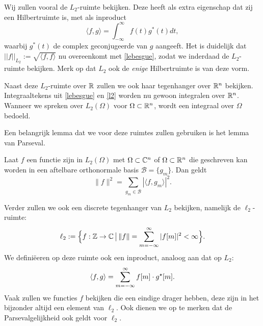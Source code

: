 Wij zullen vooral de $L_2$-ruimte bekijken. Deze heeft als extra eigenschap dat zij een Hilbertruimte is, 
met als inproduct
\begin{equation}
	\label{l2}
	\langle f, g \rangle = \int_{-\infty}^\infty f(t) g^*(t) dt,
\end{equation}
waarbij $g^*(t)$ de complex geconjugeerde van $g$ aangeeft.
Het is duidelijk dat $ || f ||_{L_2} := \sqrt{\langle f, f \rangle}$ nu overeenkomt met \eqref{lebesgue}, zodat we inderdaad de $L_2$-ruimte bekijken. Merk op dat $L_2$ ook de \emph{enige} Hilbertruimte is van deze vorm.

Naast deze $L_2$-ruimte over $\mathbb{R}$ zullen we ook haar tegenhanger over $\mathbb{R}^n$ bekijken. Integraaltekens uit \eqref{lebesgue} en \eqref{l2} worden nu gewoon integralen over $\mathbb{R}^n$. Wanneer we spreken over $L_2(\Omega)$ voor $\Omega \subset \mathbb{R}^n$, wordt een integraal over $\Omega$ bedoeld.

Een belangrijk lemma dat we voor deze ruimtes zullen gebruiken is het lemma van Parseval.
\begin{lemm}
  \label{parseval}
  Laat $f$ een functie zijn in $L_2(\Omega)$ met $\Omega \subset \mathbb{C}^n$ of $\Omega\subset\mathbb{R}^n$ die geschreven kan worden in een aftelbare 
  orthonormale basis $\mathcal{B}=\{g_m\}$. Dan geldt
  \[
  \|f\|^2 = \sum_{g_m\in\mathcal{B}} | \langle f, g_m \rangle |^2.
  \]
\end{lemm}

Verder zullen we ook een discrete tegenhanger van $L_2$ bekijken, namelijk de $\ell_2$-ruimte:
\[
\ell_2 :=\Big \{f:\mathbb{Z} \to \mathbb{C} \,\big|\, \|f\| = \sum_{m=-\infty}^\infty |f[m]|^2 < \infty \Big \}.
\]
We defini\"eeren op deze ruimte ook een inproduct, analoog aan dat op $L_2$:
\[
\langle f , g \rangle = \sum_{m=-\infty}^\infty f[m]\cdot g^\star[m].
\]
Vaak zullen we functies $f$ bekijken die een eindige drager hebben, deze zijn in het bijzonder altijd een element
van $\ell_2$. Ook dienen we op te merken dat de Parsevalgelijkheid ook geldt voor $\ell_2$.